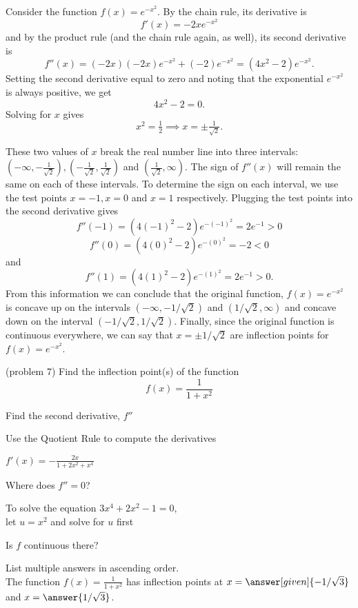 \documentclass{ximera}
\begin{document}
\begin{example}[example 7]
Consider the function $f(x) = e^{-x^2}.$ By the chain rule, its derivative is 
\[
f'(x) = -2xe^{-x^2}
\]
and by the product rule (and the chain rule again, as well), its second derivative is
\[
f''(x) = (-2x)(-2x)e^{-x^2} + (-2)e^{-x^2} = (4x^2 - 2)e^{-x^2}.
\]
Setting the second derivative equal to zero and noting that the exponential $e^{-x^2}$ is
always positive, we get
\[
4x^2 - 2 = 0.
\]
Solving for $x$ gives
\[
x^2 = \tfrac 12 \implies  x = \pm \tfrac{1}{\sqrt{2}}.
\]

These two values of $x$ break the real number line into three intervals: $(-\infty, -\tfrac{1}{\sqrt 2}),
(-\tfrac{1}{\sqrt 2}, \tfrac{1}{\sqrt 2})$ and $(\tfrac{1}{\sqrt 2}, \infty)$. 
The sign of $f''(x)$ will remain the same on each of these intervals. 
To determine the sign on each interval, we use the test points
$x = -1, x = 0$ and $x = 1$ respectively.
Plugging the test points into the second derivative gives
\[
f''(-1) = (4(-1)^2 - 2) e^{-(-1)^2} = 2e^{-1} > 0
\]
\[
f''(0) = (4(0)^2 - 2) e^{-(0)^2} = -2 < 0
\]
and
\[
f''(1) = (4(1)^2 - 2) e^{-(1)^2} = 2e^{-1} > 0.
\]
From this information we can conclude that the original function, $f(x) = e^{-x^2}$
is concave up on the intervals $(-\infty, -1/\sqrt 2)$ and $(1/\sqrt 2, \infty)$ and 
concave down on the interval $(-1/\sqrt 2, 1/\sqrt 2)$. 
Finally, since the original function is continuous everywhere, we can
say that $x = \pm 1/\sqrt 2$ are inflection points for $f(x) = e^{-x^2}$.
\end{example}

\begin{problem}(problem 7)
  Find the inflection point(s) of the function
  \[
     f(x) = \frac{1}{1+x^2}
  \]
 
    \begin{hint}
      Find the second derivative, $f''$
    \end{hint}
    \begin{hint}
      Use the Quotient Rule to compute the derivatives
    \end{hint}
		\begin{hint}
      $f'(x) = -\frac{2x}{1+2x^2+x^4}$
    \end{hint}
		\begin{hint}
      Where does $f'' = 0$?
    \end{hint}
		\begin{hint}
		 To solve the equation $3x^4 + 2x^2 - 1 = 0$, \\
		 let $u = x^2$ and solve for $u$ first
    \end{hint}
		\begin{hint}
      Is $f$ continuous there?
    \end{hint}  
		List multiple answers in ascending order.\\
		The function $f(x) = \frac{1}{1+x^2}$ has inflection 
		points at $x =\answer[given]{-1/\sqrt 3}$ and $x=\answer{1/\sqrt 3}$.
		
		
\end{problem}
\end{document}
